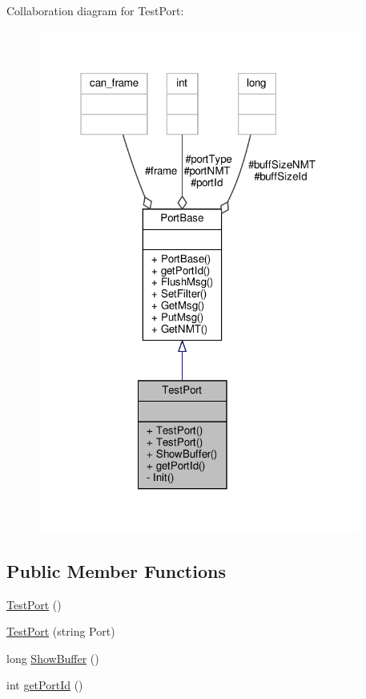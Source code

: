 Collaboration diagram for Test\+Port\+:\nopagebreak
\begin{figure}[H]
\begin{center}
\leavevmode
\includegraphics[width=301pt]{classTestPort__coll__graph}
\end{center}
\end{figure}
\subsection*{Public Member Functions}
\begin{DoxyCompactItemize}
\item 
\hyperlink{classTestPort_adde46780527e08b738eb5b32defa1c3a}{Test\+Port} ()
\item 
\hyperlink{classTestPort_a93293d14818c76db0b4ef1273cf5ce19}{Test\+Port} (string Port)
\item 
long \hyperlink{classTestPort_acc9bf1db6c1ca7d9040591306100ab36}{Show\+Buffer} ()
\item 
int \hyperlink{classTestPort_abf6a7327e26838aaf3e2e4482668085f}{get\+Port\+Id} ()
\end{DoxyCompactItemize}
